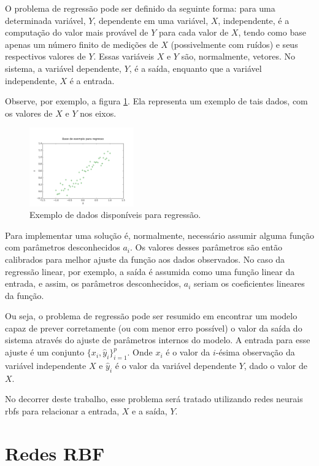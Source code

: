 \documentclass[conference]{IEEEtran}
\begin{document}
O problema de regressão \cite{specht1991general} pode ser definido da seguinte 
forma: para uma determinada variável, $Y$, dependente em uma variável, $X$, 
independente, é a computação do valor mais provável de $Y$ para cada valor de 
$X$, tendo como base apenas um número finito de medições de $X$ (possivelmente 
com ruídos) e seus respectivos valores de $Y$. Essas variáveis $X$ e $Y$ são, 
normalmente, vetores. No sistema, a variável dependente, $Y$, é a saída, 
enquanto que a variável independente, $X$ é a entrada.

Observe, por exemplo, a figura \ref{fig:regressao}. Ela representa um 
exemplo de tais dados, com os valores de $X$ e $Y$ nos eixos.

\begin{figure}[t]
	\caption{Exemplo de dados disponíveis para regressão.}
	\label{fig:regressao}
	\centering
	\includegraphics[width=0.40\textwidth]{regression_data_example}
\end{figure}

Para implementar uma solução é, normalmente, necessário assumir alguma função 
com parâmetros desconhecidos $a_{i}$. Os valores desses parâmetros são então 
calibrados para melhor ajuste da função aos dados observados. No caso da 
regressão linear, por exemplo, a saída é assumida como uma função linear da 
entrada, e assim, os parâmetros desconhecidos, $a_{i}$ seriam os coeficientes 
lineares da função.

Ou seja, o problema de regressão pode ser resumido em encontrar um modelo capaz 
de prever corretamente (ou com menor erro possível) o valor da saída do sistema
através do ajuste de parâmetros internos do modelo. A entrada para esse ajuste é 
um conjunto $\{x_{i}, \hat{y}_{i}\}_{i=1}^{p}$. Onde $x_{i}$ é o valor da 
$i$-ésima observação da variável independente $X$ e $\hat{y}_{i}$ é o valor da 
variável dependente $Y$, dado o valor de $X$.

No decorrer deste trabalho, esse problema será tratado utilizando redes neurais 
\acp*{rbf} para relacionar a entrada, $X$ e a saída, $Y$.

\section{Redes RBF}
\label{rbf}
\end{document}

